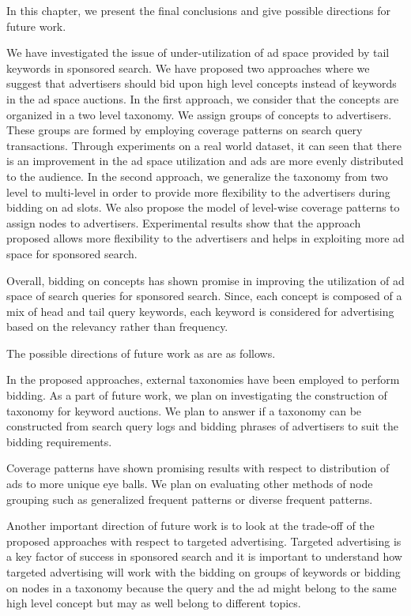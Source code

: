 In this chapter, we present the final conclusions and give possible directions for future work.


We have investigated the issue of under-utilization of ad space provided by tail keywords in sponsored search. We have proposed two approaches where we suggest that advertisers should bid upon high level concepts instead of keywords in the ad space auctions. In the first approach, we consider that the concepts are organized in a two level taxonomy. We assign groups of concepts to advertisers. These groups are formed by employing coverage patterns on search query transactions. Through experiments on a real world dataset, it can seen that there is an improvement in the ad space utilization and ads are more evenly distributed to the audience. In the second approach, we generalize the taxonomy from two level to multi-level in order to provide more flexibility to the advertisers during bidding on ad slots. We also propose the model of level-wise coverage patterns to assign nodes to advertisers. Experimental results show that the approach proposed allows more flexibility to the advertisers and helps in exploiting more ad space for sponsored search.

Overall, bidding on concepts has shown promise in improving the utilization of ad space of search queries for sponsored search. Since, each concept is composed of a mix of head and tail query keywords, each keyword is considered for advertising based on the relevancy rather than frequency.



The possible directions of future work as are as follows. 


In the proposed approaches, external taxonomies have been employed to perform bidding. As a part of future work, we plan on investigating the construction of taxonomy for keyword auctions. We plan to answer if a taxonomy can be constructed from search query logs and bidding phrases of advertisers to suit the bidding requirements.

Coverage patterns have shown promising results with respect to distribution of ads to more unique eye balls. We plan on evaluating other methods of node grouping such as generalized frequent patterns or diverse frequent patterns.

Another important direction of future work is to look at the trade-off of the proposed approaches with respect to targeted advertising. Targeted advertising is a key factor of success in sponsored search and it is important to understand how targeted advertising will work with the bidding on groups of keywords or bidding on nodes in a taxonomy because the query and the ad might belong to the same high level concept but may as well belong to different topics. 

